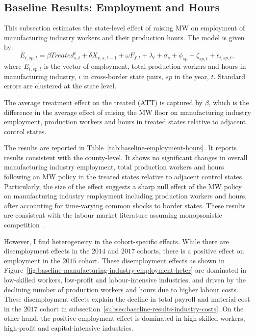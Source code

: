 \documentclass{C:/Users/david/OneDrive/Documents/ULMS/PhD/Thesis/chapter3/src/climate_change/latex/Economic_Journal/OUP-EJ}
\begin{document}
    \subsection{Baseline Results: Employment and Hours}\label{subsec:baseline-results-employment-and-hours}
    This subsection estimates the state-level effect of raising MW on employment of manufacturing industry workers and their production hours. The model is given by:
    \begin{equation}
        E_{i,sp,t} = \beta Treated_{s,t}^e + \delta X_{v,s,t-1} + \omega F_{f,t} + \lambda_{t} + \sigma_{s} + \phi_{sp} + \zeta_{sp,t} + \epsilon_{i,sp,t},\label{eq:baseline-emp-hours}
    \end{equation}
    where $E_{i,sp,t}$ is the vector of employment, total production workers and hours in manufacturing industry, $i$ in cross-border state pairs, $sp$ in the year, $t$. Standard errors are clustered at the state level.
    

    The average treatment effect on the treated (ATT) is captured by $\beta$, which is the difference in the average effect of raising the MW floor on manufacturing industry employment, production workers and hours in treated states relative to adjacent control states.

    The results are reported in Table~\ref{tab:baseline-employment-hours}. It reports results consistent with the county-level. It shows no significant changes in overall manufacturing industry employment, total production workers and hours following an MW policy in the treated states relative to adjacent control states. Particularly, the size of the effect suggests a sharp null effect of the MW policy on manufacturing industry employment including production workers and hours, after accounting for time-varying common shocks to border states. These results are consistent with the labour market literature assuming monopsonistic competition~\citep{card2000minimum, aaronson2018industry, cengiz2019effect, wong2019minimum, dustmann2022reallocation}.

    However, I find heterogeneity in the cohort-specific effects. While there are disemployment effects in the $2014$ and $2017$ cohorts, there is a positive effect on employment in the $2015$ cohort. These disemployment effects as shown in Figure~\ref{fig:baseline-manufacturing-industry-employment-heter} are dominated in low-skilled workers, low-profit and labour-intensive industries, and driven by the declining number of production workers and hours due to higher labour costs. These disemployment effects explain the decline in total payroll and material cost in the $2017$ cohort in subsection~\ref{subsec:baseline-results-industry-costs}. On the other hand, the positive employment effect is dominated in high-skilled workers, high-profit and capital-intensive industries.
\end{document}
